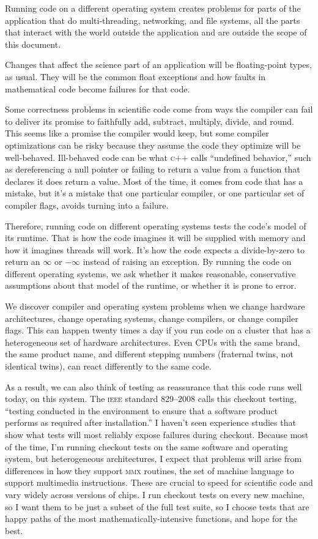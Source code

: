 \documentclass[fleqn,10pt]{olplainarticle}
\newcommand{\cpp}{\textsc{c}++\xspace}
\newcommand{\ieee}{\textsc{ieee}\xspace}
\begin{document}
Running code on a different operating system creates problems
for parts of the application that do multi-threading, networking,
and file systems, all the parts that interact with the world outside
the application and are outside the scope of this document.

Changes that affect the science part of an application will
be floating-point types, as usual. They will be the common float exceptions
and how faults in mathematical code become failures for that code.

Some correctness problems in scientific code come from ways
the compiler can fail to deliver its promise to faithfully
add, subtract, multiply, divide, and round. This seems like
a promise the compiler would keep, but some compiler optimizations
can be risky because they assume the code they optimize will
be well-behaved. Ill-behaved code can be what \cpp calls
``undefined behavior,'' such as dereferencing a null pointer
or failing to return a value from a function that declares
it does return a value. Most of the time, it comes from code
that has a mistake, but it's a mistake that one particular
compiler, or one particular set of compiler flags, avoids
turning into a failure.

Therefore, running code on different operating systems tests
the code's model of its runtime. That is how the code imagines
it will be supplied with memory and how it imagines threads
will work. It's how the code expects a divide-by-zero to return
an $\infty$ or $-\infty$ instead of raising an exception.
By running the code on different operating systems, we ask
whether it makes reasonable, conservative assumptions about
that model of the runtime, or whether it is prone to error.

We discover compiler and operating system problems when we
change hardware architectures, change operating systems,
change compilers, or change compiler flags. This can happen
twenty times a day if you run code on a cluster that has
a heterogeneous set of hardware architectures. Even CPUs with
the same brand, the same product name, and different stepping
numbers (fraternal twins, not identical twins), can react differently
to the same code.

As a result, we can also think of testing as reassurance that this
code runs well today, on this system. The \ieee standard 829--2008
calls this checkout testing, 
``testing conducted in the environment to ensure that a
software product performs as required after installation.''
I haven't seen experience studies that show what tests will most
reliably expose failures during checkout. Because most of
the time, I'm running checkout tests on the same software
and operating system, but heterogeneous architectures, I expect
that problems will arise from differences in how they support
\textsc{mmx} routines, the set of machine language to support
multimedia instructions. These are crucial to speed for scientific
code and vary widely across versions of chips. I run checkout
tests on every new machine, so I want them to be just a subset
of the full test suite, so I choose tests that are
happy paths of the most mathematically-intensive functions,
and hope for the best.
\end{document}

